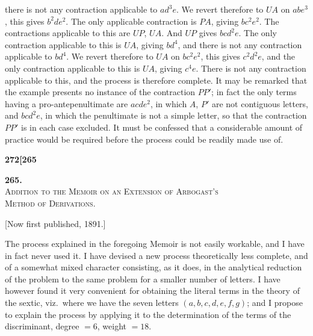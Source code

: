 \documentclass[11pt]{article}
\begin{document}
\medskip

\noindent there is not any contraction applicable to $a d^3 e$. We revert therefore to $UA$ on $a b e^3$, this gives $b^2 d e^2$. The only applicable contraction is $PA$, giving $b c^2 e^2$. The contractions applicable to this are $UP$, $UA$. And $UP$ gives $b c d^2 e$. The only contraction applicable to this is $UA$, giving $b d^4$, and there is not any contraction applicable to $b d^4$. We revert therefore to $UA$ on $b c^2 e^2$, this gives $c^2 d^2 e$, and the only contraction applicable to this is $UA$, giving $c^4 e$. There is not any contraction applicable to this, and the process is therefore complete. It may be remarked that the example presents no instance of the contraction $PP'$; in fact the only terms having a pro-antepenultimate are $a c d e^2$, in which $A$, $P'$ are not contiguous letters, and $b c d^2 e$, in which the penultimate is not a simple letter, so that the contraction $PP'$ is in each case excluded. It must be confessed that a considerable amount of practice would be required before the process could be readily made use of.

\newpage
\setcounter{page}{272}

\noindent\textbf{272}\hfill\textbf{[265}

\bigskip

\begin{center}
{\large\textbf{265.}}\\[0.6em]
{\large\textsc{Addition to the Memoir on an Extension of Arbogast's}}\\
{\large\textsc{Method of Derivations.}}
\end{center}

\medskip

\noindent\small[Now first published, 1891.]\normalsize

\medskip

\noindent The process explained in the foregoing Memoir is not easily workable, and I have in fact never used it. I have devised a new process theoretically less complete, and of a somewhat mixed character consisting, as it does, in the analytical reduction of the problem to the same problem for a smaller number of letters. I have however found it very convenient for obtaining the literal terms in the theory of the sextic, viz.\ where we have the seven letters $(a, b, c, d, e, f, g)$; and I propose to explain the process by applying it to the determination of the terms of the discriminant, degree $= 6$, weight $= 18$.

\medskip
\end{document}
